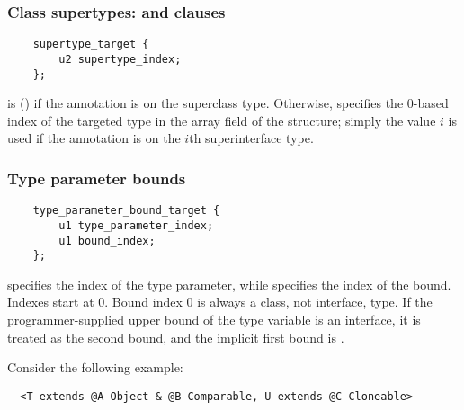 \documentclass[10pt]{article}
\begin{document}
\subsubsection{Class supertypes:   and  clauses\label{class-file:ext:ri:extends}}


\preverbnegspace
\begin{Verbatim}
    supertype_target {
        u2 supertype_index;
    };
\end{Verbatim}

 is  () if the annotation is on the
superclass type.  Otherwise,  specifies the 0-based index of the
targeted type in the
 array field of the  structure;
simply the value $i$ is used if the annotation is on the $i$th
superinterface type.



\subsubsection{Type parameter bounds\label{class-file:ext:ri:tpbound}}


\preverbnegspace
\begin{Verbatim}
    type_parameter_bound_target {
        u1 type_parameter_index;
        u1 bound_index;
    };
\end{Verbatim}

 specifies the index of the type parameter, while
 specifies the index of the bound.  Indexes start at 0.
Bound index 0 is always a class, not interface, type.
If the programmer-supplied upper bound of the type variable is an
interface, it is treated as the second bound, and the implicit first bound
is .

Consider the following
example:

\preverbnegspace
\begin{Verbatim}
  <T extends @A Object & @B Comparable, U extends @C Cloneable>
\end{Verbatim}
\end{document}
